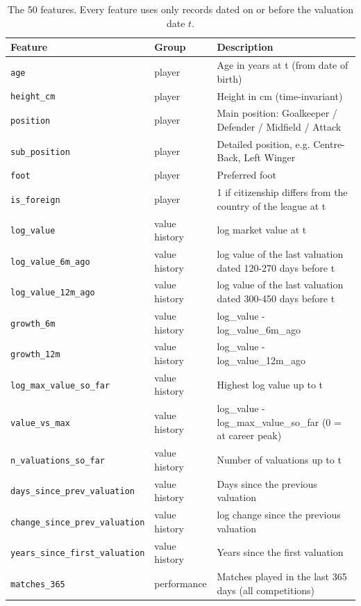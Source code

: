 \begin{table}[t]
\centering
\caption{The 50 features. Every feature uses only records dated on or before the valuation date $t$.}
\label{tab:features}
\scriptsize
\begin{tabular}{llp{11.5cm}}
\toprule
Feature & Group & Description \\
\midrule
\texttt{age} & player & Age in years at t (from date of birth) \\
\texttt{height\_cm} & player & Height in cm (time-invariant) \\
\texttt{position} & player & Main position: Goalkeeper / Defender / Midfield / Attack \\
\texttt{sub\_position} & player & Detailed position, e.g. Centre-Back, Left Winger \\
\texttt{foot} & player & Preferred foot \\
\texttt{is\_foreign} & player & 1 if citizenship differs from the country of the league at t \\
\texttt{log\_value} & value history & log market value at t \\
\texttt{log\_value\_6m\_ago} & value history & log value of the last valuation dated 120-270 days before t \\
\texttt{log\_value\_12m\_ago} & value history & log value of the last valuation dated 300-450 days before t \\
\texttt{growth\_6m} & value history & log\_value - log\_value\_6m\_ago \\
\texttt{growth\_12m} & value history & log\_value - log\_value\_12m\_ago \\
\texttt{log\_max\_value\_so\_far} & value history & Highest log value up to t \\
\texttt{value\_vs\_max} & value history & log\_value - log\_max\_value\_so\_far (0 = at career peak) \\
\texttt{n\_valuations\_so\_far} & value history & Number of valuations up to t \\
\texttt{days\_since\_prev\_valuation} & value history & Days since the previous valuation \\
\texttt{change\_since\_prev\_valuation} & value history & log change since the previous valuation \\
\texttt{years\_since\_first\_valuation} & value history & Years since the first valuation \\
\texttt{matches\_365} & performance & Matches played in the last 365 days (all competitions) \\

\end{tabular}
\end{table}
